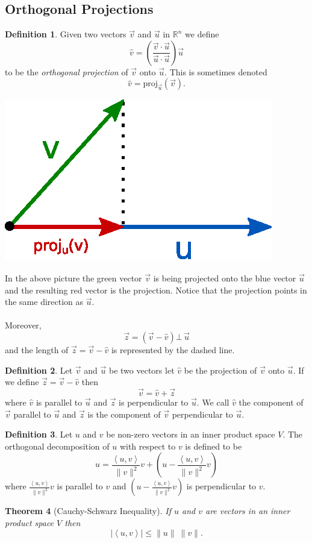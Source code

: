\documentclass[12pt,letterpaper]{article}
\newcommand{\ip}[2]{\left\langle {#1}, {#2}\right\rangle}
\theoremstyle{plain}
\newtheorem{theorem}{Theorem}[section]
\theoremstyle{definition}
\newtheorem{definition}[theorem]{Definition}
\numberwithin{equation}{section}
\begin{document}
\subsection{Orthogonal Projections}
\begin{definition} Given two vectors $\vec{v}$ and $\vec{u}$ in $\mathbb{R}^n$ we define
\[\hat{v}=\left(\dfrac{\vec{v}\cdot \vec{u}}{\vec{u}\cdot \vec{u}}\right)\vec{u}\] to be the \emph{orthogonal projection} of $\vec{v}$ onto $\vec{u}$. 
This is sometimes denoted
\[\hat{v}=\text{proj}_{\vec{u}}(\vec{v}).\]
\begin{center}
\includegraphics[scale=.75]{vector_projection.eps}
\end{center}
\end{definition}
In the above picture the green vector $\vec{v}$ is being projected onto the blue vector $\vec{u}$ and the resulting red vector is the projection. Notice that the projection points in the same direction as $\vec{u}$. \\
\ \\
Moreover, 
\[\vec{z}=(\vec{v}-\hat{v})\bot\, \vec{u}\]
and the length of $\vec{z}=\vec{v}-\hat{v}$ is represented by the dashed line.
\begin{definition}
Let $\vec{v}$ and $\vec{u}$ be two vectors let $\hat{v}$ be the projection of $\vec{v}$ onto $\vec{u}$. If we define $\vec{z}=\vec{v}-\hat{v}$ then
\[\vec{v}=\hat{v}+\vec{z}\] where $\hat{v}$ is parallel to $\vec{u}$ and $\vec{z}$ is perpendicular to $\vec{u}$. We call $\hat{v}$ the component of $\vec{v}$ parallel to $\vec{u}$ and $\vec{z}$ is the component of $\vec{v}$ perpendicular to $\vec{u}$. 
\end{definition}
\begin{definition} Let $u$ and $v$ be non-zero vectors in an inner product space $V$. The orthogonal decomposition of $u$ with respect to $v$ is defined to be 
\[u=\frac{\ip{u}{v}}{\ \|v\|^2}v+\left(u-\frac{\ip{u}{v}}{\|v\|^2}v\right)\]
where $\frac{\ip{u}{v}}{\ \|v\|^2}v$ is parallel to $v$ and $\left(u-\frac{\ip{u}{v}}{\ \|v\|^2}v\right)$ is perpendicular to $v$. 
\end{definition}
\begin{theorem}[Cauchy-Schwarz Inequality]If $u$ and $v$ are vectors in an inner product space $V$ then 
\[\left|\ip{u}{v}\right|\leq \|u\|\ \|v\|.\]
\end{theorem}
\end{document}
